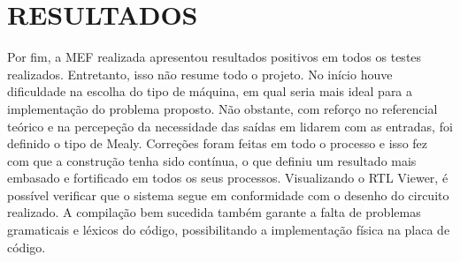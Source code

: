 \chapter{RESULTADOS}
Por fim, a MEF realizada apresentou resultados positivos em todos os testes realizados. Entretanto, isso não resume todo o projeto. No início houve dificuldade na escolha do tipo de máquina, em qual seria mais ideal para a implementação do problema proposto. Não obstante, com reforço no referencial teórico e na percepeção da necessidade das saídas em lidarem com as entradas, foi definido o tipo de Mealy. Correções foram feitas em todo o processo e isso fez com que a construção tenha sido contínua, o que definiu um resultado mais embasado e fortificado em todos os seus processos. Visualizando o RTL Viewer, é possível verificar que o sistema segue em conformidade com o desenho do circuito realizado. A compilação bem sucedida também garante a falta de problemas gramaticais e léxicos do código, possibilitando a implementação física na placa de código.